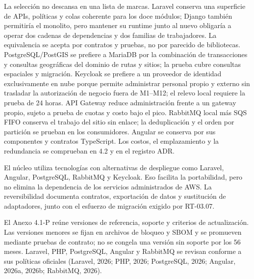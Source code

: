 La selección no descansa en una lista de marcas. Laravel conserva una superficie de APIs, políticas y colas coherente para los doce módulos; Django también permitiría el monolito, pero mantener su runtime junto al nuevo obligaría a operar dos cadenas de dependencias y dos familias de trabajadores. La equivalencia se acepta por contratos y pruebas, no por parecido de bibliotecas. PostgreSQL/PostGIS se prefiere a MariaDB por la combinación de transacciones y consultas geográficas del dominio de rutas y sitios; la prueba cubre consultas espaciales y migración. Keycloak se prefiere a un proveedor de identidad exclusivamente en nube porque permite administrar personal propio y externo sin trasladar la autorización de negocio fuera de M1--M12; el relevo local requiere la prueba de 24 horas. API Gateway reduce administración frente a un gateway propio, sujeto a prueba de cuotas y costo bajo el pico. RabbitMQ local más SQS FIFO conserva el trabajo del sitio sin enlace; la deduplicación y el orden por partición se prueban en los consumidores. Angular se conserva por sus componentes y contratos TypeScript. Los costos, el emplazamiento y la redundancia se comprueban en 4.2 y en el registro ADR.

El núcleo utiliza tecnologías con alternativas de despliegue como Laravel, Angular, PostgreSQL, RabbitMQ y Keycloak. Eso facilita la portabilidad, pero no elimina la dependencia de los servicios administrados de AWS. La reversibilidad documenta contratos, exportación de datos y sustitución de adaptadores, junto con el esfuerzo de migración exigido por RT-03.07.

El Anexo 4.1-P reúne versiones de referencia, soporte y criterios de actualización. Las versiones menores se fijan en archivos de bloqueo y SBOM y se promueven mediante pruebas de contrato; no se congela una versión sin soporte por los 56 meses. Laravel, PHP, PostgreSQL, Angular y RabbitMQ se revisan conforme a sus políticas oficiales (Laravel, 2026; PHP, 2026; PostgreSQL, 2026; Angular, 2026a, 2026b; RabbitMQ, 2026).

